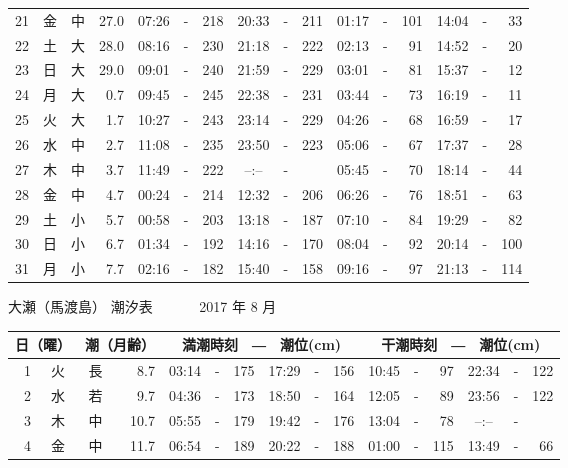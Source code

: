 \documentclass[12pt.a4j]{jsarticle}
\begin{document}
\begin{center}
\begin{table}[ht]
\begin{tabular}{|rc|cr|ccrccr|ccrccr|}
21 & 金 & 中 & 27.0 &  07:26 &-& 218  &  20:33 &-& 211  &   01:17 &-& 101  &   14:04 &-&  33  \\
22 & 土 & 大 & 28.0 &  08:16 &-& 230  &  21:18 &-& 222  &   02:13 &-&  91  &   14:52 &-&  20  \\
23 & 日 & 大 & 29.0 &  09:01 &-& 240  &  21:59 &-& 229  &   03:01 &-&  81  &   15:37 &-&  12  \\
24 & 月 & 大 &  0.7 &  09:45 &-& 245  &  22:38 &-& 231  &   03:44 &-&  73  &   16:19 &-&  11  \\
25 & 火 & 大 &  1.7 &  10:27 &-& 243  &  23:14 &-& 229  &   04:26 &-&  68  &   16:59 &-&  17  \\
26 & 水 & 中 &  2.7 &  11:08 &-& 235  &  23:50 &-& 223  &   05:06 &-&  67  &   17:37 &-&  28  \\
27 & 木 & 中 &  3.7 &  11:49 &-& 222  &  --:-- &-&     &   05:45 &-&  70  &   18:14 &-&  44  \\
28 & 金 & 中 &  4.7 &  00:24 &-& 214  &  12:32 &-& 206  &   06:26 &-&  76  &   18:51 &-&  63  \\
29 & 土 & 小 &  5.7 &  00:58 &-& 203  &  13:18 &-& 187  &   07:10 &-&  84  &   19:29 &-&  82  \\
30 & 日 & 小 &  6.7 &  01:34 &-& 192  &  14:16 &-& 170  &   08:04 &-&  92  &   20:14 &-& 100  \\
31 & 月 & 小 &  7.7 &  02:16 &-& 182  &  15:40 &-& 158  &   09:16 &-&  97  &   21:13 &-& 114  \\
   \hline
   \end{tabular}
\end{table}
\newpage
 {\LARGE 大瀬（馬渡島）  潮汐表　　　}
 {\large 2017 年  8 月}\\
 \begin{table}[ht]
    \begin{tabular}{|rc|cr|ccrccr|ccrccr|}
    \hline
    \multicolumn{2}{|c|}{日（曜）} & \multicolumn{2}{c|}{潮（月齢）} & \multicolumn{6}{c|}{満潮時刻　―　潮位(cm)} & \multicolumn{6}{c|}{干潮時刻　―　潮位(cm)} \\
 \hline
 1 & 火 & 長 &  8.7 &  03:14 &-& 175  &  17:29 &-& 156  &   10:45 &-&  97  &   22:34 &-& 122  \\
 2 & 水 & 若 &  9.7 &  04:36 &-& 173  &  18:50 &-& 164  &   12:05 &-&  89  &   23:56 &-& 122  \\
 3 & 木 & 中 & 10.7 &  05:55 &-& 179  &  19:42 &-& 176  &   13:04 &-&  78  &   --:-- &-&     \\
 4 & 金 & 中 & 11.7 &  06:54 &-& 189  &  20:22 &-& 188  &   01:00 &-& 115  &   13:49 &-&  66  \\

\end{tabular}
\end{table}
\end{center}
\end{document}
